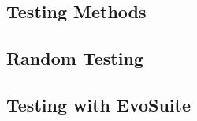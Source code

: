 


\subsection{Testing Methods}





\subsection{Random Testing}



\subsection{Testing with EvoSuite}

























